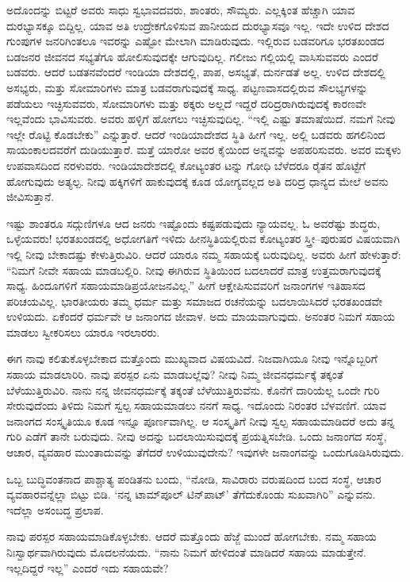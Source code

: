 ಅದೊಂದನ್ನು ಬಿಟ್ಟರೆ ಅವರು ಸಾಧು ಸ್ವಭಾವದವರು, ಶಾಂತರು, ಸೌಮ್ಯರು. ಎಲ್ಲಕ್ಕಿಂತ ಹೆಚ್ಚಾಗಿ ಯಾವ ದುರಭ್ಯಾಸಕ್ಕೂ ಬಿದ್ದಿಲ್ಲ. ಯಾವ ಅತಿ ಉದ್ರೇಕಗೊಳಿಸುವ ಪಾನೀಯದ ದುರಭ್ಯಾಸವೂ ಇಲ್ಲ. ಇದೇ ಉಳಿದ ದೇಶದ ಗುಂಪುಗಳ ಜನರಿಗಿಂತಲೂ ಇವರನ್ನು ಎಷ್ಟೋ ಮೇಲಾಗಿ ಮಾಡಿರುವುದು. ಇಲ್ಲಿರುವ ಬಡವರಿಗೂ ಭರತಖಂಡದ ಬಡಜನರ ಜೀವನದ ಸಭ್ಯತೆಗೂ ಹೋಲಿಸುವುದಕ್ಕೇ ಆಗುವುದಿಲ್ಲ. ಗಲೀಜು ಗಲ್ಲಿಯಲ್ಲಿ ವಾಸಿಸುವವರು ಎಂದರೆ ಬಡವರು. ಆದರೆ ಬಡತನವೆಂದರೆ ಇಂಡಿಯಾ ದೇಶದಲ್ಲಿ, ಪಾಪ, ಅಸಭ್ಯತೆ, ದುರ್ನಡತೆ ಅಲ್ಲ. ಉಳಿದ ದೇಶದಲ್ಲಿ ಅಸಭ್ಯರು, ಮತ್ತು ಸೋಮಾರಿಗಳು ಮಾತ್ರ ಬಡವರಾಗುವುದಕ್ಕೆ ಸಾಧ್ಯ. ಪಟ್ಟಣವಾಸದಲ್ಲಿರುವ ಸೌಲಭ್ಯಗಳನ್ನು ಪಡೆಯಲು ಇಚ್ಛಿಸುವವರು, ಸೋಮಾರಿಗಳು ಮತ್ತು ಠಕ್ಕರು ಅಲ್ಲದೆ ಇದ್ದರೆ ದರಿದ್ರರಾಗಿರುವುದಕ್ಕೆ ಕಾರಣವೇ ಇಲ್ಲವೆಂದು ಭಾವಿಸುವರು. ಅವರು ಹಳ್ಳಿಗೆ ಹೋಗಲು ಇಚ್ಛಿಸುವುದಿಲ್ಲ. “ಇಲ್ಲಿ ಎಷ್ಟು ತಮಾಷೆಯಿದೆ. ನಮಗೆ ನೀವು ಇಲ್ಲೇ ರೊಟ್ಟಿ ಕೊಡಬೇಕು” ಎನ್ನುತ್ತಾರೆ. ಆದರೆ ಇಂಡಿಯಾದೇಶದ ಸ್ಥಿತಿ ಹೀಗೆ ಇಲ್ಲ. ಅಲ್ಲಿ ಬಡವರು ಹಗಲಿನಿಂದ ಸಾಯಂಕಾಲದವರೆಗೆ ದುಡಿಯುತ್ತಾರೆ. ಮತ್ತೆ ಯಾರೋ ಅವರ ಕೈಯಿಂದ ಅನ್ನವನ್ನು ಅಪಹರಿಸುವರು. ಅವರ ಮಕ್ಕಳು ಉಪವಾಸದಿಂದ ನರಳುವರು. ಇಂಡಿಯಾದೇಶದಲ್ಲಿ ಕೋಟ್ಯಂತರ ಟನ್ನು ಗೋಧಿ ಬೆಳೆದರೂ ರೈತನ ಹೊಟ್ಟೆಗೆ ಹೋಗುವುದು ಅತ್ಯಲ್ಪ. ನೀವು ಹಕ್ಕಿಗಳಿಗೆ ಹಾಕುವುದಕ್ಕೆ ಕೂಡ ಯೋಗ್ಯವಲ್ಲದ ಅತಿ ದರಿದ್ರ ಧಾನ್ಯದ ಮೇಲೆ ಅವನು ಜೀವಿಸುತ್ತಾನೆ.

ಇಷ್ಟು ಶಾಂತರೂ ಸದ್ಗುಣಿಗಳೂ ಆದ ಜನರು ಇಷ್ಟೊಂದು ಕಷ್ಟಪಡುವುದು ನ್ಯಾಯವಲ್ಲ. ಓ ಅವರೆಷ್ಟು ಶುದ್ಧರು, ಒಳ್ಳೆಯವರು! ಭರತಖಂಡದಲ್ಲಿ ಅಧೋಗತಿಗೆ ಇಳಿದು ಹೀನಸ್ಥಿತಿಯಲ್ಲಿರುವ ಕೋಟ್ಯಂತರ ಸ್ತ್ರೀ–ಪುರುಷರ ವಿಷಯವಾಗಿ ಇಲ್ಲಿ ನೀವು ಬೇಕಾದಷ್ಟು ಕೇಳುತ್ತಿರುವಿರಿ. ಆದರೆ ಯಾರೂ ನಮ್ಮ ಸಹಾಯಕ್ಕೆ ಬರುವುದಿಲ್ಲ. ಅವರು ಹೀಗೆ ಹೇಳುತ್ತಾರೆ: “ನಿಮಗೆ ನೀವೇ ಸಹಾಯ ಮಾಡಬಲ್ಲಿರಿ. ನೀವು ಈಗಿರುವ ಸ್ಥಿತಿಯಿಂದ ಬದಲಾದರೆ ಮಾತ್ರ ಉತ್ತಮರಾಗುವುದಕ್ಕೆ ಸಾಧ್ಯ. ಹಿಂದೂಗಳಿಗೆ ಸಹಾಯಮಾಡಿ\break ಪ್ರಯೋಜನವಿಲ್ಲ.” ಹೀಗೆ ಆಕ್ಷೇಪಿಸುವವರಿಗೆ ಜನಾಂಗಗಳ ಇತಿಹಾಸದ ಪರಿಚಯವಿಲ್ಲ. ಭಾರತೀಯರು ತಮ್ಮ ಧರ್ಮ ಮತ್ತು ಸಮಾಜದ ರಚನೆಯನ್ನು ಬದಲಾಯಿಸಿದರೆ ಭರತಖಂಡವೇ ಉಳಿಯದು. ಏಕೆಂದರೆ ಧರ್ಮವೇ ಆ ಜನಾಂಗದ ಜೀವಾಳ. ಅದು ಮಾಯವಾಗುವುದು. ಅನಂತರ ನಿಮಗೆ ಸಹಾಯ ಮಾಡಲು ಸ್ವೀಕರಿಸಲು ಯಾರೂ ಇರಲಾರರು.

ಈಗ ನಾವು ಕಲಿತುಕೊಳ್ಳಬೇಕಾದ ಮತ್ತೊಂದು ಮುಖ್ಯವಾದ ವಿಷಯವಿದೆ. ನಿಜವಾಗಿಯೂ ನೀವು ಇನ್ನೊಬ್ಬರಿಗೆ ಸಹಾಯ ಮಾಡಲಾರಿರಿ. ನಾವು ಪರಸ್ಪರ ಏನು ಮಾಡಬಲ್ಲೆವು? ನೀವು ನಿಮ್ಮ ಜೀವನಧರ್ಮಕ್ಕೆ ತಕ್ಕಂತೆ ಬೆಳೆಯುತ್ತಿರುವಿರಿ. ನಾನು ನನ್ನ ಜೀವನಧರ್ಮಕ್ಕೆ ತಕ್ಕಂತೆ ಬೆಳೆಯುತ್ತಿರುವೆನು. ಕೊನೆಗೆ ದಾರಿಯೆಲ್ಲ ಒಂದೇ ಗುರಿ ಸೇರುವುದೆಂದು ತಿಳಿದು ನಿಮಗೆ ಸ್ವಲ್ಪ ಸಹಾಯಮಾಡಲು ನನಗೆ ಸಾಧ್ಯ. ಇದೊಂದು ನಿರಂತರ ಬೆಳವಣಿಗೆ. ಯಾವ ಜನಾಂಗದ ಸಂಸ್ಕೃತಿಯೂ ಕೂಡ ಇನ್ನೂ ಪೂರ್ಣವಾಗಿಲ್ಲ. ಆ ಸಂಸ್ಕೃತಿಗೆ ನೀವು ಸ್ವಲ್ಪ ಸಹಾಯಮಾಡಿದರೆ ಅದು ತನ್ನ ಗುರಿ ಎಡೆಗೆ ತಾನೇ ಬರುವುದು. ನೀವು ಅದನ್ನು ಬದಲಾಯಿಸುವುದಕ್ಕೆ ಪ್ರಯತ್ನಿಸಬೇಡಿ. ಒಂದು ಜನಾಂಗದ ಸಂಸ್ಥೆ, ಆಚಾರ, ವ್ಯವಹಾರ ಮುಂತಾದುವನ್ನು ತೆಗೆದರೆ ಉಳಿಯುವುದೇನು? ಇವುಗಳೇ ಜನಾಂಗವನ್ನು ಒಂದುಗೂಡಿಸಿರುವುದು.

ಒಬ್ಬ ಬುದ್ಧಿವಂತನಾದ ಪಾಶ್ಚಾತ್ಯ ಪಂಡಿತನು ಬಂದು, “ನೋಡಿ, ಸಾವಿರಾರು ವರುಷದಿಂದ ಬಂದ ಸಂಸ್ಥೆ, ಆಚಾರ ವ್ಯವಹಾರವನ್ನೆಲ್ಲಾ ಬಿಟ್ಟು ಬಿಡಿ. `ನನ್ನ ಟಾಮ್‌ಪೂಲ್ ಟಿನ್‌ಪಾಟ್' ತೆಗೆದುಕೊಂಡು ಸುಖವಾಗಿರಿ” ಎನ್ನುವನು. ಇದೆಲ್ಲಾ ಅಸಂಬದ್ಧ ಪ್ರಲಾಪ.

ನಾವು ಪರಸ್ಪರ ಸಹಾಯಮಾಡಿಕೊಳ್ಳಬೇಕು. ಆದರೆ ಮತ್ತೊಂದು ಹೆಜ್ಜೆ ಮುಂದೆ ಹೋಗಬೇಕು. ನಮ್ಮ ಸಹಾಯ ನಿಃಸ್ವಾರ್ಥವಾಗಿರುವುದು ಮೊದಲನೆಯದು. “ನಾನು ನಿಮಗೆ ಹೇಳಿದಂತೆ ಮಾಡಿದರೆ ಸಹಾಯ ಮಾಡುತ್ತೇನೆ. ಇಲ್ಲದಿದ್ದರೆ ಇಲ್ಲ” ಎಂದರೆ ಇದು ಸಹಾಯವೇ?

